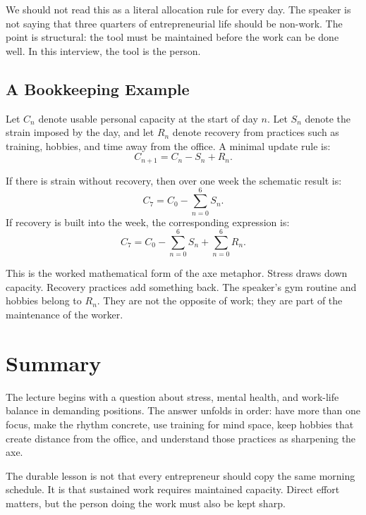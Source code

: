 We should not read this as a literal allocation rule for every day. The speaker is not saying that three quarters of entrepreneurial life should be non-work. The point is structural: the tool must be maintained before the work can be done well. In this interview, the tool is the person.

\subsection{A Bookkeeping Example}

Let \(C_n\) denote usable personal capacity at the start of day \(n\). Let \(S_n\) denote the strain imposed by the day, and let \(R_n\) denote recovery from practices such as training, hobbies, and time away from the office. A minimal update rule is:
\begin{equation}
C_{n+1}=C_n-S_n+R_n.
\end{equation}

If there is strain without recovery, then over one week the schematic result is:
\begin{equation}
C_7
=
C_0-\sum_{n=0}^{6}S_n.
\end{equation}
If recovery is built into the week, the corresponding expression is:
\begin{equation}
C_7
=
C_0-\sum_{n=0}^{6}S_n
+
\sum_{n=0}^{6}R_n.
\end{equation}

This is the worked mathematical form of the axe metaphor. Stress draws down capacity. Recovery practices add something back. The speaker's gym routine and hobbies belong to \(R_n\). They are not the opposite of work; they are part of the maintenance of the worker.

\section{Summary}

The lecture begins with a question about stress, mental health, and work-life balance in demanding positions. The answer unfolds in order: have more than one focus, make the rhythm concrete, use training for mind space, keep hobbies that create distance from the office, and understand those practices as sharpening the axe.

The durable lesson is not that every entrepreneur should copy the same morning schedule. It is that sustained work requires maintained capacity. Direct effort matters, but the person doing the work must also be kept sharp.